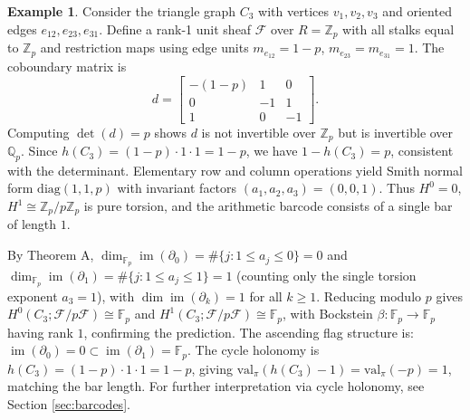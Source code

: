 \documentclass[11pt]{amsart}
\theoremstyle{plain}
\theoremstyle{definition}
\newtheorem{example}[theorem]{Example}
\newcommand{\Zp}{\mathbb{Z}_p}                        %
\newcommand{\Qp}{\mathbb{Q}_p}                        %
\newcommand{\valpi}{\mathrm{val}_{\unif}}                   %
\newcommand{\Ring}{R}                          %
\newcommand{\unif}{\pi}                        %
\newcommand{\sheaf}[1]{\mathcal{#1}}                  %
\newcommand{\Bock}{\beta}            %
\newcommand{\Digit}[1]{\partial_{#1}}%
\newcommand{\coboundary}{d}                           %
\DeclareMathOperator{\im}{im}                         %
\begin{document}
\begin{example}
\label{ex:triangle}    
Consider the triangle graph $C_3$ with vertices $v_1, v_2, v_3$ and oriented edges 
$e_{12}, e_{23}, e_{31}$. Define a rank-1 unit sheaf $\sheaf{F}$ over $\Ring = \Zp$ 
with all stalks equal to $\Zp$ and restriction maps using edge units $m_{e_{12}} = 1-p$, 
$m_{e_{23}} = m_{e_{31}} = 1$. The coboundary matrix is
\[
\coboundary = \begin{bmatrix}
-(1-p) & 1 & 0 \\
0 & -1 & 1 \\
1 & 0 & -1
\end{bmatrix}.
\]
Computing $\det(\coboundary) = p$ shows $\coboundary$ is not invertible over $\Zp$ 
but is invertible over $\Qp$. Since $h(C_3) = (1-p) \cdot 1 \cdot 1 = 1-p$, we have $1 - h(C_3) = p$, consistent with the determinant. Elementary row and column operations yield Smith 
normal form $\mathrm{diag}(1, 1, p)$ with invariant factors $(a_1, a_2, a_3) = (0, 0, 1)$. 
Thus $H^0 = 0$, $H^1 \cong \Zp/p\Zp$ is pure torsion, and the arithmetic barcode 
consists of a single bar of length $1$.

By Theorem A, $\dim_{\mathbb{F}_p} \im(\Digit{0}) = \#\{j : 1 \le a_j \le 0\} = 0$ 
and $\dim_{\mathbb{F}_p} \im(\Digit{1}) = \#\{j : 1 \le a_j \le 1\} = 1$ (counting only the single torsion exponent $a_3 = 1$), with $\dim \im(\Digit{k}) = 1$ for all $k \ge 1$. Reducing modulo $p$ gives $H^0(C_3; 
\sheaf{F}/p\sheaf{F}) \cong \mathbb{F}_p$ and $H^1(C_3; \sheaf{F}/p\sheaf{F}) 
\cong \mathbb{F}_p$, with Bockstein $\Bock: \mathbb{F}_p \to \mathbb{F}_p$ having 
rank $1$, confirming the prediction. The ascending flag structure is: $\im(\Digit{0}) = 0 
\subset \im(\Digit{1}) = \mathbb{F}_p$. The cycle holonomy is $h(C_3) = (1-p) \cdot 1 
\cdot 1 = 1-p$, giving $\valpi(h(C_3)-1) = \valpi(-p) = 1$, matching the bar 
length. For further interpretation via cycle holonomy, see Section \ref{sec:barcodes}.
\end{example}
\end{document}
